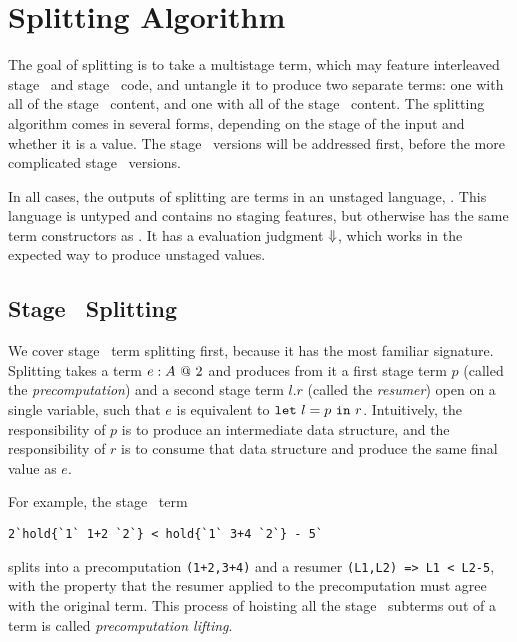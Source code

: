 
\section{Splitting Algorithm}
\label{sec:splitting}


The goal of splitting is to take a multistage term,
which may feature interleaved stage \bbone\ and stage \bbtwo\ code,
and untangle it to produce two separate terms:
one with all of the stage \bbone\ content, and one with all of the stage \bbtwo\ content.
The splitting algorithm comes in several forms, depending on the stage of the input and whether it is a value.
The stage \bbtwo\ versions will be addressed first,
before the more complicated stage \bbone\ versions.

In all cases, the outputs of splitting are terms in an unstaged language, \langmono. 
This language is untyped and contains no staging features, 
but otherwise has the same term constructors as \lang. 
It has a evaluation judgment ${\Downarrow}$, which works in the expected way to produce unstaged values.

\subsection {Stage \bbtwo\ Splitting}

We cover stage \bbtwo\ term splitting first, because it has the most familiar signature.
Splitting takes a term ${e}:{A}~@~ 2$ and produces from it a first stage term
$p$ (called the {\em precomputation}) and a second stage term $l.r$ (called the {\em resumer})
open on a single variable, such that $e$ is equivalent to ${\tt let}~{l} = {p}~{\tt in}~{r}$.
Intuitively, the responsibility of $p$ is to produce an intermediate data structure, 
and the responsibility of $r$ is to consume that data structure and produce the same final value as $e$.

 For example, the stage \bbtwo\ term
\begin{lstlisting}
2`hold{`1` 1+2 `2`} < hold{`1` 3+4 `2`} - 5`
\end{lstlisting}
splits into a precomputation \verb|(1+2,3+4)| and a resumer
\verb|(L1,L2) => L1 < L2-5|, with the property that the resumer applied to
the precomputation must agree with the original term. This process of hoisting
all the stage \bbone\ subterms out of a term is called \emph{precomputation lifting}.

